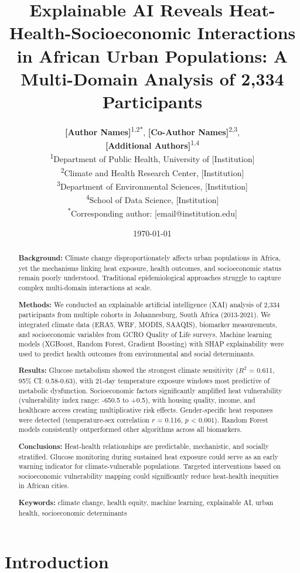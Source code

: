 \documentclass[11pt,a4paper]{article}
\title{\Large \textbf{Explainable AI Reveals Heat-Health-Socioeconomic Interactions in African Urban Populations: A Multi-Domain Analysis of 2,334 Participants}}
\author{
\textbf{[Author Names]}\textsuperscript{1,2*}, 
\textbf{[Co-Author Names]}\textsuperscript{2,3}, \\
\textbf{[Additional Authors]}\textsuperscript{1,4}\\[0.5em]
\small
\textsuperscript{1}Department of Public Health, University of [Institution]\\
\textsuperscript{2}Climate and Health Research Center, [Institution]\\
\textsuperscript{3}Department of Environmental Sciences, [Institution]\\
\textsuperscript{4}School of Data Science, [Institution]\\[0.5em]
\textsuperscript{*}Corresponding author: [email@institution.edu]
}
\date{\today}
\newcommand{\pvalue}{p}
\newcommand{\CI}[1]{95\% CI: #1}
\begin{document}
\maketitle

\begin{abstract}
\textbf{Background:} Climate change disproportionately affects urban populations in Africa, yet the mechanisms linking heat exposure, health outcomes, and socioeconomic status remain poorly understood. Traditional epidemiological approaches struggle to capture complex multi-domain interactions at scale.

\textbf{Methods:} We conducted an explainable artificial intelligence (XAI) analysis of 2,334 participants from multiple cohorts in Johannesburg, South Africa (2013-2021). We integrated climate data (ERA5, WRF, MODIS, SAAQIS), biomarker measurements, and socioeconomic variables from GCRO Quality of Life surveys. Machine learning models (XGBoost, Random Forest, Gradient Boosting) with SHAP explainability were used to predict health outcomes from environmental and social determinants.

\textbf{Results:} Glucose metabolism showed the strongest climate sensitivity ($R^2$ = 0.611, \CI{0.58-0.63}), with 21-day temperature exposure windows most predictive of metabolic dysfunction. Socioeconomic factors significantly amplified heat vulnerability (vulnerability index range: -650.5 to +0.5), with housing quality, income, and healthcare access creating multiplicative risk effects. Gender-specific heat responses were detected (temperature-sex correlation $r$ = 0.116, $\pvalue$ < 0.001). Random Forest models consistently outperformed other algorithms across all biomarkers.

\textbf{Conclusions:} Heat-health relationships are predictable, mechanistic, and socially stratified. Glucose monitoring during sustained heat exposure could serve as an early warning indicator for climate-vulnerable populations. Targeted interventions based on socioeconomic vulnerability mapping could significantly reduce heat-health inequities in African cities.

\textbf{Keywords:} climate change, health equity, machine learning, explainable AI, urban health, socioeconomic determinants
\end{abstract}

\section{Introduction}
\end{document}
